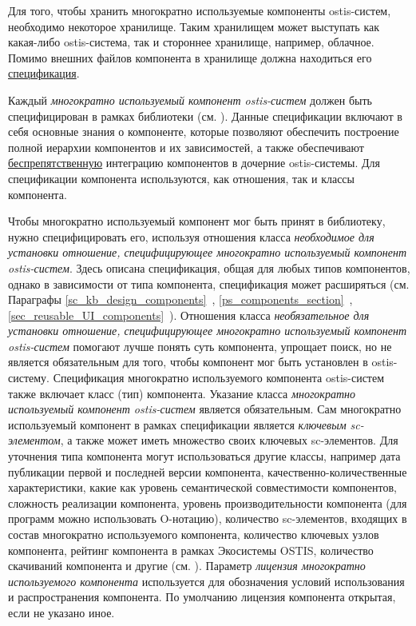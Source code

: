 Для того, чтобы хранить многократно используемые компоненты ostis-систем, необходимо некоторое хранилище. Таким хранилищем может выступать как какая-либо ostis-система, так и стороннее хранилище, например, облачное. Помимо внешних файлов компонента в хранилище должна находиться его \underline{спецификация}.

Каждый \textit{многократно используемый компонент ostis-систем} должен быть специфицирован в рамках библиотеки (см. ). Данные спецификации включают в себя основные знания о компоненте, которые позволяют обеспечить построение полной иерархии компонентов и их зависимостей, а также обеспечивают \underline{беспрепятственную} интеграцию компонентов в дочерние ostis-системы. Для спецификации компонента используются, как отношения, так и классы компонента.

Чтобы многократно используемый компонент мог быть принят в библиотеку, нужно специфицировать его, используя отношения класса \textit{необходимое для установки отношение, специфицирующее многократно используемый компонент ostis-систем}. Здесь описана спецификация, общая для любых типов компонентов, однако в зависимости от типа компонента, спецификация может расширяться (см. Параграфы \ref{sc_kb_design_components}~, \ref{ps_components_section}~, \ref{sec_reusable_UI_components}~). Отношения класса \textit{необязательное для установки отношение, специфицирующее многократно используемый компонент ostis-систем} помогают лучше понять суть компонента, упрощает поиск, но не является обязательным для того, чтобы компонент мог быть установлен в ostis-систему. Спецификация многократно используемого компонента ostis-систем также включает класс (тип) компонента. Указание класса \textit{многократно используемый компонент ostis-систем} является обязательным. Сам многократно используемый компонент в рамках спецификации является \textit{ключевым sc-элементом}, а также может иметь множество своих ключевых sc-элементов. Для уточнения типа компонента могут использоваться другие классы, например дата публикации первой и последней версии компонента, качественно-количественные характеристики, какие как уровень семантической совместимости компонентов, сложность реализации компонента, уровень производительности компонента (для программ можно использовать O-нотацию), количество sc-элементов, входящих в состав многократно используемого компонента, количество ключевых узлов компонента, рейтинг компонента в рамках Экосистемы OSTIS, количество скачиваний компонента и другие (см. ). Параметр \textit{лицензия многократно используемого компонента} используется для обозначения условий использования и распространения компонента. По умолчанию лицензия компонента открытая, если не указано иное.

